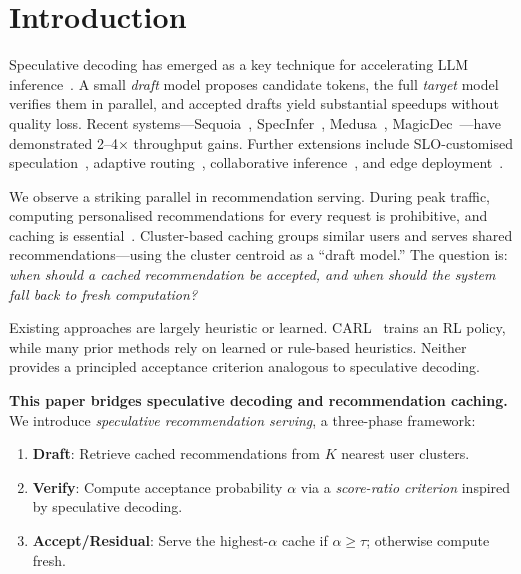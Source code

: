 \documentclass[sigconf,nonacm=false]{acmart}
\begin{document}


\maketitle

\section{Introduction}

Speculative decoding has emerged as a key technique for accelerating LLM inference~\cite{leviathan2023, chen2023speculative}. A small \emph{draft} model proposes candidate tokens, the full \emph{target} model verifies them in parallel, and accepted drafts yield substantial speedups without quality loss. Recent systems---Sequoia~\cite{sequoia2024}, SpecInfer~\cite{specinfer2024}, Medusa~\cite{medusa2024}, MagicDec~\cite{magicdec2024}---have demonstrated 2--4$\times$ throughput gains. Further extensions include SLO-customised speculation~\cite{adaserve2025}, adaptive routing~\cite{specrouter2025}, collaborative inference~\cite{cosine_spec2025}, and edge deployment~\cite{sled2025}.

We observe a striking parallel in recommendation serving. During peak traffic, computing personalised recommendations for every request is prohibitive, and caching is essential~\cite{carl2024, rpaf2024}. Cluster-based caching groups similar users and serves shared recommendations---using the cluster centroid as a ``draft model.'' The question is: \emph{when should a cached recommendation be accepted, and when should the system fall back to fresh computation?}

Existing approaches are largely heuristic or learned. CARL~\cite{carl2024} trains an RL policy, while many prior methods rely on learned or rule-based heuristics. Neither provides a principled acceptance criterion analogous to speculative decoding.

\textbf{This paper bridges speculative decoding and recommendation caching.} We introduce \emph{speculative recommendation serving}, a three-phase framework:
\begin{enumerate}
    \item \textbf{Draft}: Retrieve cached recommendations from $K$ nearest user clusters.
    \item \textbf{Verify}: Compute acceptance probability $\alpha$ via a \emph{score-ratio criterion} inspired by speculative decoding.
    \item \textbf{Accept/Residual}: Serve the highest-$\alpha$ cache if $\alpha \geq \tau$; otherwise compute fresh.
\end{enumerate}
\end{document}
